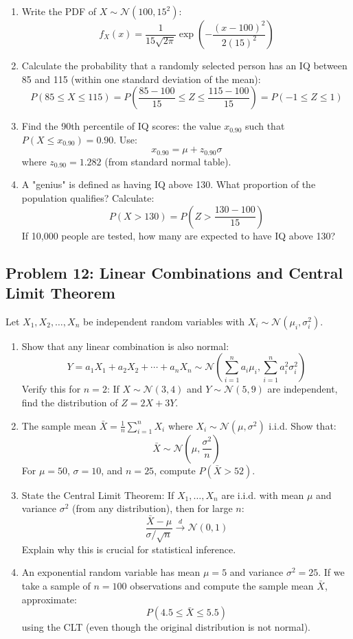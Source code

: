 \documentclass[12pt]{article}
\begin{document}
\begin{enumerate}[label=(\alph*)]
\item Write the PDF of \(X \sim \mathcal{N}(100, 15^2)\):
\[
f_X(x) = \frac{1}{15\sqrt{2\pi}}\exp\left(-\frac{(x-100)^2}{2(15)^2}\right)
\]

\item Calculate the probability that a randomly selected person has an IQ between 85 and 115 (within one standard deviation of the mean):
\[
P(85 \leq X \leq 115) = P\left(\frac{85-100}{15} \leq Z \leq \frac{115-100}{15}\right) = P(-1 \leq Z \leq 1)
\]

\item Find the 90th percentile of IQ scores: the value \(x_{0.90}\) such that \(P(X \leq x_{0.90}) = 0.90\). Use:
\[
x_{0.90} = \mu + z_{0.90} \sigma
\]
where \(z_{0.90} = 1.282\) (from standard normal table).

\item A "genius" is defined as having IQ above 130. What proportion of the population qualifies? Calculate:
\[
P(X > 130) = P\left(Z > \frac{130-100}{15}\right)
\]
If 10,000 people are tested, how many are expected to have IQ above 130?
\end{enumerate}

\subsection*{Problem 12: Linear Combinations and Central Limit Theorem}

Let \(X_1, X_2, \ldots, X_n\) be independent random variables with \(X_i \sim \mathcal{N}(\mu_i, \sigma_i^2)\).

\begin{enumerate}[label=(\alph*)]
\item Show that any linear combination is also normal:
\[
Y = a_1 X_1 + a_2 X_2 + \cdots + a_n X_n \sim \mathcal{N}\left(\sum_{i=1}^{n} a_i\mu_i, \sum_{i=1}^{n} a_i^2\sigma_i^2\right)
\]
Verify this for \(n = 2\): If \(X \sim \mathcal{N}(3, 4)\) and \(Y \sim \mathcal{N}(5, 9)\) are independent, find the distribution of \(Z = 2X + 3Y\).

\item The sample mean \(\bar{X} = \frac{1}{n}\sum_{i=1}^{n} X_i\) where \(X_i \sim \mathcal{N}(\mu, \sigma^2)\) i.i.d. Show that:
\[
\bar{X} \sim \mathcal{N}\left(\mu, \frac{\sigma^2}{n}\right)
\]
For \(\mu = 50\), \(\sigma = 10\), and \(n = 25\), compute \(P(\bar{X} > 52)\).

\item State the Central Limit Theorem: If \(X_1, \ldots, X_n\) are i.i.d. with mean \(\mu\) and variance \(\sigma^2\) (from any distribution), then for large \(n\):
\[
\frac{\bar{X} - \mu}{\sigma/\sqrt{n}} \xrightarrow{d} \mathcal{N}(0, 1)
\]
Explain why this is crucial for statistical inference.

\item An exponential random variable has mean \(\mu = 5\) and variance \(\sigma^2 = 25\). If we take a sample of \(n = 100\) observations and compute the sample mean \(\bar{X}\), approximate:
\[
P(4.5 \leq \bar{X} \leq 5.5)
\]
using the CLT (even though the original distribution is not normal).
\end{enumerate}
\end{document}
